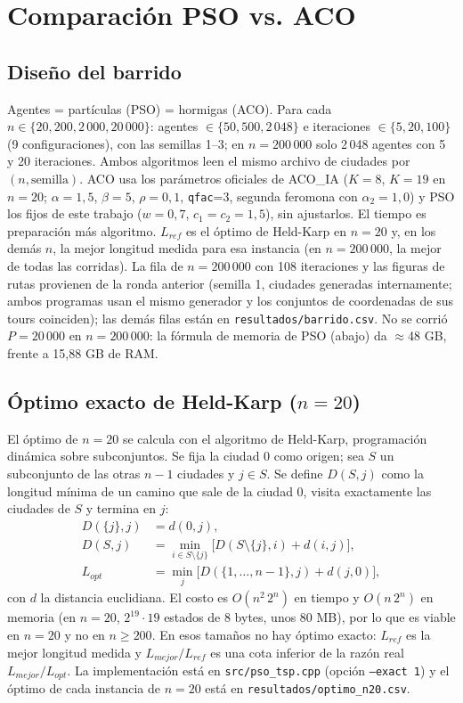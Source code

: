 \section{Comparación PSO vs. ACO}
\label{sec:comparacion}
\subsection{Diseño del barrido}
Agentes = partículas (PSO) = hormigas (ACO). Para cada $n\in\{20, 200, 2\,000, 20\,000\}$:
agentes $\in\{50, 500, 2\,048\}$ e iteraciones $\in\{5, 20, 100\}$ (9 configuraciones),
con las semillas 1--3; en $n=200\,000$ solo 2\,048 agentes con 5 y 20 iteraciones.
Ambos algoritmos leen el mismo archivo de ciudades por $(n,\text{semilla})$.
ACO usa los parámetros oficiales de ACO\_IA ($K=8$, $K=19$ en $n=20$;
$\alpha=1{,}5$, $\beta=5$, $\rho=0{,}1$, \texttt{qfac}=3, segunda feromona con $\alpha_2=1{,}0$) y
PSO los fijos de este trabajo ($w=0{,}7$, $c_1=c_2=1{,}5$), sin ajustarlos. El tiempo es
preparación más algoritmo. $L_{ref}$ es el óptimo de Held-Karp en $n=20$ y, en los demás
$n$, la mejor longitud medida para esa instancia (en $n=200\,000$, la mejor de todas las
corridas). La fila de $n=200\,000$ con 108 iteraciones y las figuras de rutas provienen de la
ronda anterior (semilla 1, ciudades generadas internamente; ambos programas usan el mismo
generador y los conjuntos de coordenadas de sus tours coinciden); las demás filas están en
\texttt{resultados/barrido.csv}. No se corrió $P=20\,000$ en $n=200\,000$: la fórmula de
memoria de PSO (abajo) da $\approx$48 GB, frente a 15,88 GB de RAM.

\subsection{Óptimo exacto de Held-Karp ($n=20$)}
El óptimo de $n=20$ se calcula con el algoritmo de Held-Karp, programación dinámica sobre
subconjuntos. Se fija la ciudad 0 como origen; sea $S$ un subconjunto de las otras
$n-1$ ciudades y $j\in S$. Se define $D(S,j)$ como la longitud mínima de un camino que sale de
la ciudad 0, visita exactamente las ciudades de $S$ y termina en $j$:
\begin{align*}
D(\{j\},j) &= d(0,j),\\
D(S,j) &= \min_{i\in S\setminus\{j\}} \bigl[D(S\setminus\{j\},i) + d(i,j)\bigr],\\
L_{opt} &= \min_{j} \bigl[D(\{1,\dots,n-1\},j) + d(j,0)\bigr],
\end{align*}
con $d$ la distancia euclidiana. El costo es $O(n^2\,2^n)$ en tiempo y $O(n\,2^n)$ en memoria
(en $n=20$, $2^{19}\cdot19$ estados de 8 bytes, unos 80 MB), por lo que es viable en $n=20$ y
no en $n\ge200$. En esos tamaños no hay óptimo exacto: $L_{ref}$ es la mejor longitud medida y
$L_{mejor}/L_{ref}$ es una cota inferior de la razón real $L_{mejor}/L_{opt}$. La implementación
está en \texttt{src/pso\_tsp.cpp} (opción \texttt{--exact 1}) y el óptimo de cada instancia de
$n=20$ está en \texttt{resultados/optimo\_n20.csv}.

